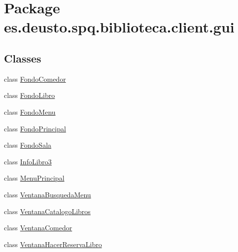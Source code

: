 \hypertarget{namespacees_1_1deusto_1_1spq_1_1biblioteca_1_1client_1_1gui}{}\section{Package es.\+deusto.\+spq.\+biblioteca.\+client.\+gui}
\label{namespacees_1_1deusto_1_1spq_1_1biblioteca_1_1client_1_1gui}
\subsection*{Classes}
\begin{DoxyCompactItemize}
\item 
class \mbox{\hyperlink{classes_1_1deusto_1_1spq_1_1biblioteca_1_1client_1_1gui_1_1_fondo_comedor}{Fondo\+Comedor}}
\item 
class \mbox{\hyperlink{classes_1_1deusto_1_1spq_1_1biblioteca_1_1client_1_1gui_1_1_fondo_libro}{Fondo\+Libro}}
\item 
class \mbox{\hyperlink{classes_1_1deusto_1_1spq_1_1biblioteca_1_1client_1_1gui_1_1_fondo_menu}{Fondo\+Menu}}
\item 
class \mbox{\hyperlink{classes_1_1deusto_1_1spq_1_1biblioteca_1_1client_1_1gui_1_1_fondo_principal}{Fondo\+Principal}}
\item 
class \mbox{\hyperlink{classes_1_1deusto_1_1spq_1_1biblioteca_1_1client_1_1gui_1_1_fondo_sala}{Fondo\+Sala}}
\item 
class \mbox{\hyperlink{classes_1_1deusto_1_1spq_1_1biblioteca_1_1client_1_1gui_1_1_info_libro3}{Info\+Libro3}}
\item 
class \mbox{\hyperlink{classes_1_1deusto_1_1spq_1_1biblioteca_1_1client_1_1gui_1_1_menu_principal}{Menu\+Principal}}
\item 
class \mbox{\hyperlink{classes_1_1deusto_1_1spq_1_1biblioteca_1_1client_1_1gui_1_1_ventana_busqueda_menu}{Ventana\+Busqueda\+Menu}}
\item 
class \mbox{\hyperlink{classes_1_1deusto_1_1spq_1_1biblioteca_1_1client_1_1gui_1_1_ventana_catalogo_libros}{Ventana\+Catalogo\+Libros}}
\item 
class \mbox{\hyperlink{classes_1_1deusto_1_1spq_1_1biblioteca_1_1client_1_1gui_1_1_ventana_comedor}{Ventana\+Comedor}}
\item 
class \mbox{\hyperlink{classes_1_1deusto_1_1spq_1_1biblioteca_1_1client_1_1gui_1_1_ventana_hacer_reserva_libro}{Ventana\+Hacer\+Reserva\+Libro}}
\item 

\end{DoxyCompactItemize}
